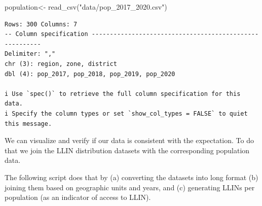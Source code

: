 \documentclass[
  letterpaper,
  DIV=11,
  numbers=noendperiod]{scrreprt}
\newenvironment{Shaded}{\begin{snugshade}}{\end{snugshade}}
\newcommand{\FunctionTok}[1]{\textcolor[rgb]{0.28,0.35,0.67}{#1}}
\newcommand{\NormalTok}[1]{\textcolor[rgb]{0.00,0.23,0.31}{#1}}
\newcommand{\OtherTok}[1]{\textcolor[rgb]{0.00,0.23,0.31}{#1}}
\newcommand{\StringTok}[1]{\textcolor[rgb]{0.13,0.47,0.30}{#1}}
\begin{document}
\begin{Shaded}
\begin{Highlighting}[]
\NormalTok{population}\OtherTok{\textless{}{-}} \FunctionTok{read\_csv}\NormalTok{(}\StringTok{"data/pop\_2017\_2020.csv"}\NormalTok{)}
\end{Highlighting}
\end{Shaded}

\begin{verbatim}
Rows: 300 Columns: 7
-- Column specification --------------------------------------------------------
Delimiter: ","
chr (3): region, zone, district
dbl (4): pop_2017, pop_2018, pop_2019, pop_2020

i Use `spec()` to retrieve the full column specification for this data.
i Specify the column types or set `show_col_types = FALSE` to quiet this message.
\end{verbatim}

We can visualize and verify if our data is consistent with the
expectation. To do that we join the LLIN distribution datasets with the
corresponding population data.

The following script does that by (a) converting the datasets into long
format (b) joining them based on geographic units and years, and (c)
generating LLINs per population (as an indicator of access to LLIN).
\end{document}
